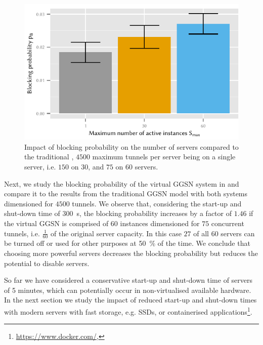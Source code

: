 \begin{figure}
  \centering
  \includegraphics{cloud/virtualized_network_functions/performance_evaluation/figures/blocking_comparison}
  \caption{Impact of blocking probability on the number of servers compared to the traditional , \(4500\) maximum tunnels per server being on a single server, i.e. \(150\) on \(30\), and \(75\) on \(60\) servers.}
  \label{fig:cloud:virtualized_network_functions:performance_evaluation:virtual_ggsn:blocking_comparison}
\end{figure}

Next, we study the blocking probability of the virtual \gls{GGSN} system in  and compare it to the results from the traditional \gls{GGSN} model with both systems dimensioned for \(4500\) tunnels.
We observe that, considering the start-up and shut-down time of \SI{300}{\second}, the blocking probability increases by a factor of \(1.46\) if the virtual \gls{GGSN} is comprised of \(60\) instances dimensioned for \(75\) concurrent tunnels, i.e. \(\frac{1}{60}\) of the original server capacity.
In this case \(27\) of all \(60\) servers can be turned off or used for other purposes at \SI{50}{\percent} of the time.
We conclude that choosing more powerful servers decreases the blocking probability but reduces the potential to disable servers.

So far we have considered a conservative start-up and shut-down time of servers of 5 minutes, which can potentially occur in non-virtualised available hardware.
In the next section we study the impact of reduced start-up and shut-down times with modern servers with fast storage, e.g. \glspl{SSD}, or containerised applications\footnote{\url{https://www.docker.com/}, \accessed}.

